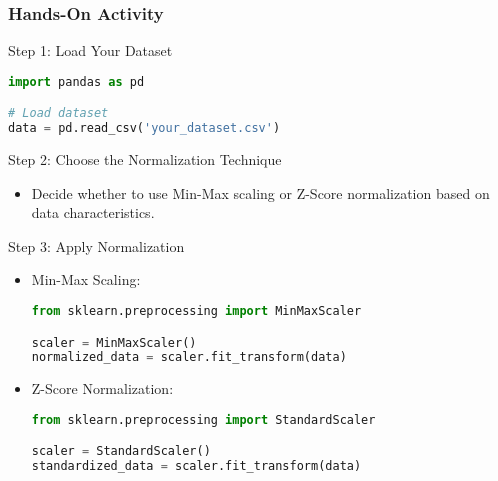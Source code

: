 \documentclass[aspectratio=169]{beamer}
\begin{document}
\begin{frame}[fragile]
    \frametitle{Hands-On Activity}
    \begin{block}{Step 1: Load Your Dataset}
        \begin{lstlisting}[language=Python]
import pandas as pd

# Load dataset
data = pd.read_csv('your_dataset.csv')
        \end{lstlisting}
    \end{block}
    
    \begin{block}{Step 2: Choose the Normalization Technique}
        \begin{itemize}
            \item Decide whether to use Min-Max scaling or Z-Score normalization based on data characteristics.
        \end{itemize}
    \end{block}

    \begin{block}{Step 3: Apply Normalization}
        \begin{itemize}
            \item Min-Max Scaling:
            \begin{lstlisting}[language=Python]
from sklearn.preprocessing import MinMaxScaler

scaler = MinMaxScaler()
normalized_data = scaler.fit_transform(data)
            \end{lstlisting}
            \item Z-Score Normalization:
            \begin{lstlisting}[language=Python]
from sklearn.preprocessing import StandardScaler

scaler = StandardScaler()
standardized_data = scaler.fit_transform(data)
            \end{lstlisting}
        \end{itemize}
    \end{block}
\end{frame}
\end{document}
